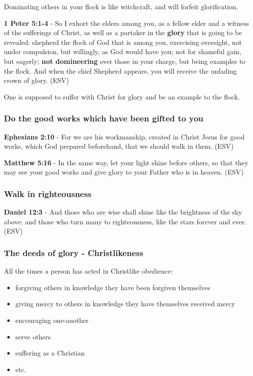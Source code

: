 \documentclass[11pt]{article}
\begin{document}
Dominating others in your flock is like witchcraft, and will forfeit glorification.

\textbf{1 Peter 5:1-4} - So I exhort the elders among you, as a fellow elder and a witness of the sufferings of Christ, as well as a partaker in the \textbf{glory} that is going to be revealed: shepherd the flock of God that is among you, exercising oversight, not under compulsion, but willingly, as God would have you; not for shameful gain, but eagerly; \textbf{not domineering} over those in your charge, but being examples to the flock. And when the chief Shepherd appears, you will receive the unfading crown of glory. (ESV)

One is supposed to suffer with Christ for glory and be an example to the flock.

\subsubsection{Do the good works which have been gifted to you}
\label{sec:orge37e872}
\textbf{Ephesians 2:10} - For we are his workmanship, created in Christ Jesus for good works, which God prepared beforehand, that we should walk in them. (ESV)

\textbf{Matthew 5:16} - In the same way, let your light shine before others, so that they may see your good works and give glory to your Father who is in heaven. (ESV)

\subsubsection{Walk in righteousness}
\label{sec:orge25b445}

\textbf{Daniel 12:3} - And those who are wise shall shine like the brightness of the sky above; and those who turn many to righteousness, like the stars forever and ever. (ESV)

\subsubsection{The deeds of glory - Christlikeness}
\label{sec:org016bb04}
All the times a person has acted in Christlike obedience:
\begin{itemize}
\item forgiving others in knowledge they have been forgiven themselves
\item giving mercy to others in knowledge they have themselves received mercy
\item encouraging one-another
\item serve others
\item suffering as a Christian
\item etc.
\end{itemize}
\end{document}

